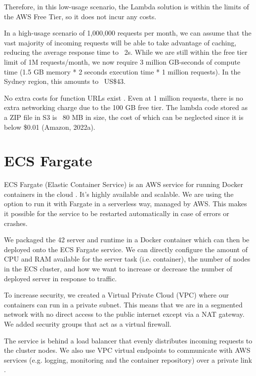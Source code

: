 Therefore, in this low-usage scenario, the Lambda solution is within the limits of the AWS Free Tier, so it does not incur any costs.

In a high-usage scenario of 1,000,000 requests per month, we can assume that the vast majority of incoming requests will be able to take advantage of caching, reducing the average response time to ~2s. While we are still within the free tier limit of 1M requests/month, we now require 3 million GB-seconds of compute time (1.5 GB memory * 2 seconds execution time * 1 million requests). In the Sydney region, this amounts to ~US\$43.

No extra costs for function URLs exist \cite{casalboni-2022}. Even at 1 million requests, there is no extra networking charge due to the 100 GB free tier. The lambda code stored as a ZIP file in S3 is ~80 MB in size, the cost of which can be neglected since it is below \$0.01 (Amazon, 2022a).

\section{ECS Fargate}

ECS Fargate (Elastic Container Service) is an AWS service for running Docker containers in the cloud \cite{amazon-2022E}. It's highly available and scalable. We are using the option to run it with Fargate in a serverless way, managed by AWS. This makes it possible for the service to be restarted automatically in case of errors or crashes.

We packaged the 42 server and runtime in a Docker container which can then be deployed onto the ECS Fargate service. We can directly configure the amount of CPU and RAM available for the server task (i.e. container), the number of nodes in the ECS cluster, and how we want to increase or decrease the number of deployed server in response to traffic.

To increase security, we created a Virtual Private Cloud (VPC) where our containers can run in a private subnet. This means that we are in a segmented network with no direct access to the public internet except via a NAT gateway. We added security groups that act as a virtual firewall.

The service is behind a load balancer that evenly distributes incoming requests to the cluster nodes. We also use VPC virtual endpoints to communicate with AWS services (e.g. logging, monitoring and the container repository) over a private link \cite{amazon-2022F}.

